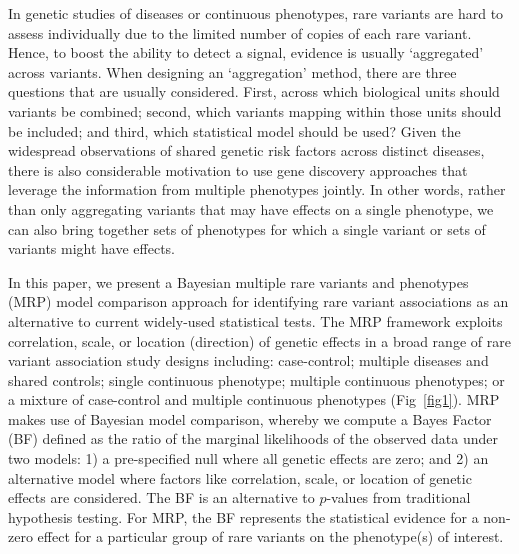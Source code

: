 In genetic studies of diseases or continuous phenotypes, rare variants are hard to assess individually due to the limited number of copies of each rare variant. Hence, to boost the ability to detect a signal, evidence is usually `aggregated' across variants. When designing an `aggregation' method, there are three questions that are usually considered. First, across which biological units should variants be combined; second, which variants mapping within those units should be included\cite{majithia2014rare}; and third, which statistical model should be used\cite{lee2014rare}? Given the widespread observations of shared genetic risk factors across distinct diseases, there is also considerable motivation to use gene discovery approaches that leverage the information from multiple phenotypes jointly. In other words, rather than only aggregating variants that may have effects on a single phenotype, we can also bring together sets of phenotypes for which a single variant or sets of variants might have effects. 

In this paper, we present a Bayesian multiple rare variants and phenotypes (MRP) model comparison approach for identifying rare variant associations as an alternative to current widely-used statistical tests. The MRP framework exploits correlation, scale, or location (direction) of genetic effects in a broad range of rare variant association study designs including: case-control; multiple diseases and shared controls; single continuous phenotype; multiple continuous phenotypes; or a mixture of case-control and multiple continuous phenotypes (Fig~\ref{fig1}). MRP makes use of Bayesian model comparison, whereby we compute a Bayes Factor (BF) defined as the ratio of the marginal likelihoods of the observed data under two models: 1) a pre-specified null where all genetic effects are zero; and 2) an alternative model where factors like correlation, scale, or location of genetic effects are considered. The BF is an alternative to $p$-values from traditional hypothesis testing. For MRP, the BF represents the statistical evidence for a non-zero effect for a particular group of rare variants on the phenotype(s) of interest.

